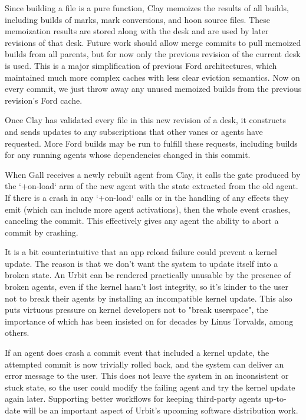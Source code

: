 \documentclass[twoside]{article}
\begin{document}
Since building a file is a pure function, Clay memoizes the results of all builds, including builds of marks, mark conversions, and hoon source files. These memoization results are stored along with the desk and are used by later revisions of that desk. Future work should allow merge commits to pull memoized builds from all parents, but for now only the previous revision of the current desk is used. This is a major simplification of previous Ford architectures, which maintained much more complex caches with less clear eviction semantics. Now on every commit, we just throw away any unused memoized builds from the previous revision's Ford cache.

Once Clay has validated every file in this new revision of a desk, it constructs and sends updates to any subscriptions that other vanes or agents have requested. More Ford builds may be run to fulfill these requests, including builds for any running agents whose dependencies changed in this commit.

When Gall receives a newly rebuilt agent from Clay, it calls the gate produced by the `+on-load` arm of the new agent with the state extracted from the old agent. If there is a crash in any `+on-load` calls or in the handling of any effects they emit (which can include more agent activations), then the whole event crashes, canceling the commit. This effectively gives any agent the ability to abort a commit by crashing.

It is a bit counterintuitive that an app reload failure could prevent a kernel update. The reason is that we don't want the system to update itself into a broken state. An Urbit can be rendered practically unusable by the presence of broken agents, even if the kernel hasn't lost integrity,
so it's kinder to the user not to break their agents by installing an incompatible kernel update. This also puts virtuous pressure on kernel developers not to "break userspace", the importance of which has been insisted on for decades by Linus Torvalds, among others.

If an agent does crash a commit event that included a kernel update, the attempted commit is now trivially rolled back, and the system can deliver an error message to the user. This does not leave the system in an inconsistent or stuck state, so the user could modify the failing agent and try the kernel update again later. Supporting better workflows for keeping third-party agents up-to-date will be an important aspect of Urbit’s upcoming software distribution work.
\end{document}
